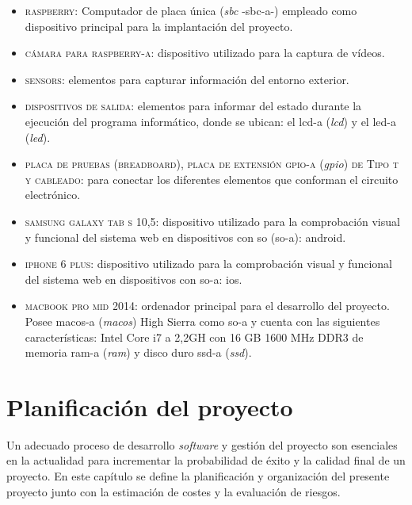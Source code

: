 \documentclass[12pt,a4paper, twoside]{report}
\begin{document}
\begin{itemize}
		\begin{itemize}
			\item \textsc{\gls{raspberry}:} Computador de placa única (\textit{\gls{sbc}} -\gls{sbc-a}-) empleado como dispositivo principal para la implantación del proyecto.
			\item \textsc{cámara para \gls{raspberry-a}:} dispositivo utilizado para la captura de vídeos.
			\item \textsc{\glspl{sensor}:} elementos para capturar información del entorno exterior.
			\item \textsc{dispositivos de salida:} elementos para informar del estado durante la ejecución del programa informático, donde se ubican: el \gls{lcd-a} (\textit{\gls{lcd}}) y el \gls{led-a} (\textit{\gls{led}}).
			\item \textsc{placa de pruebas (\gls{breadboard}), placa de extensión \gls{gpio-a}} (\textit{\gls{gpio}}) \textsc{de Tipo t y cableado:} para conectar los diferentes elementos que conforman el circuito electrónico.
			\item \textsc{samsung galaxy tab s 10,5:} dispositivo utilizado para la comprobación visual y funcional del sistema web en dispositivos con \gls{so} (\gls{so-a}): \gls{android}.
			\item \textsc{iphone 6 plus:} dispositivo utilizado para la comprobación visual y funcional del sistema web en dispositivos con \gls{so-a}: \gls{ios}.
			\item \textsc{macbook pro mid 2014:} ordenador principal para el desarrollo del proyecto. Posee \gls{macos-a} (\textit{\gls{macos}}) High Sierra como \gls{so-a} y cuenta con las siguientes características: Intel Core i7 a 2,2GH con 16 GB 1600 MHz DDR3 de memoria \gls{ram-a} (\textit{\gls{ram}}) y disco duro \gls{ssd-a} (\textit{\gls{ssd}}).
		\end{itemize}

	\end{itemize}
	
	\chapter{Planificación del proyecto} \label{planningChapter}
	
	Un adecuado proceso de desarrollo \textit{software} y gestión del proyecto son esenciales en la actualidad para incrementar la probabilidad de éxito y la calidad final de un proyecto. En este capítulo se define la planificación y organización del presente proyecto junto con la estimación de costes y la evaluación de riesgos.
	
\end{document}
